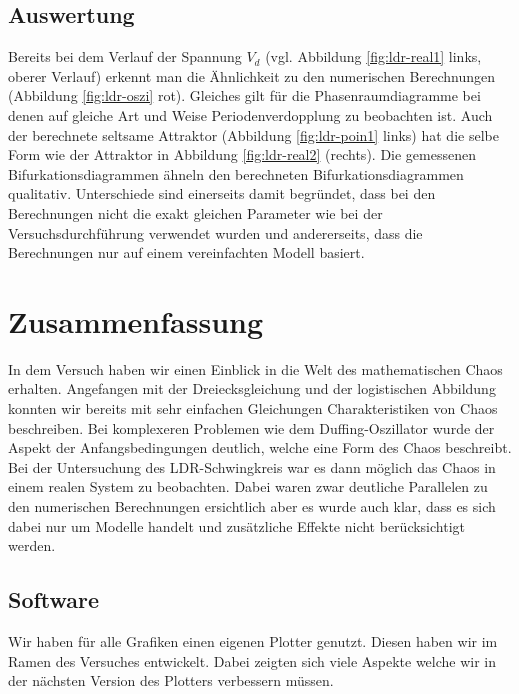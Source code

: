 \documentclass[12pt,a4paper]{article}
\begin{document}
\subsection { Auswertung }
Bereits bei dem Verlauf der Spannung $V_d$ (vgl. Abbildung \ref{fig:ldr-real1} links, oberer Verlauf) erkennt man die Ähnlichkeit zu den numerischen Berechnungen (Abbildung \ref{fig:ldr-oszi} rot). Gleiches gilt für die Phasenraumdiagramme bei denen auf gleiche Art und Weise Periodenverdopplung zu beobachten ist. Auch der berechnete seltsame Attraktor (Abbildung \ref{fig:ldr-poin1} links) hat die selbe Form wie der Attraktor in Abbildung \ref{fig:ldr-real2} (rechts).
\newline
Die gemessenen Bifurkationsdiagrammen ähneln den berechneten Bifurkationsdiagrammen qualitativ.
Unterschiede sind einerseits damit begründet, dass bei den Berechnungen nicht die exakt gleichen Parameter wie bei der Versuchsdurchführung verwendet wurden und andererseits, dass die Berechnungen nur auf einem vereinfachten Modell basiert.

\section { Zusammenfassung }
In dem Versuch haben wir einen Einblick in die Welt des mathematischen Chaos erhalten. Angefangen mit der Dreiecksgleichung und der logistischen Abbildung konnten wir bereits mit sehr einfachen Gleichungen Charakteristiken von Chaos beschreiben. Bei komplexeren Problemen wie dem Duffing-Oszillator wurde der Aspekt der Anfangsbedingungen deutlich, welche eine Form des Chaos beschreibt. Bei der Untersuchung des LDR-Schwingkreis war es dann möglich das Chaos in einem realen System zu beobachten. Dabei waren zwar deutliche Parallelen zu den numerischen Berechnungen ersichtlich aber es wurde auch klar, dass es sich dabei nur um Modelle handelt und zusätzliche Effekte nicht berücksichtigt werden.
\subsection{Software}
Wir haben für alle Grafiken einen eigenen Plotter genutzt. Diesen haben wir im Ramen des Versuches entwickelt. Dabei zeigten sich viele Aspekte welche wir in der nächsten Version des Plotters verbessern müssen.
\end{document}
